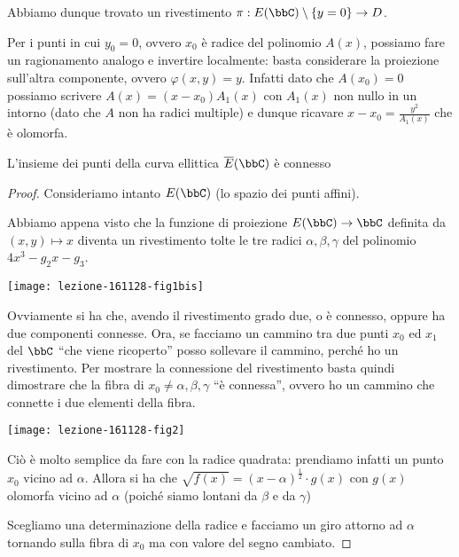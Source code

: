Abbiamo dunque trovato un rivestimento $\pi: E(\bbC)\setminus\{y=0\}\to D$.

Per i punti in cui $y_0=0$, ovvero $x_0$ è radice del polinomio $A(x)$, possiamo fare un ragionamento analogo e invertire localmente: basta considerare la proiezione sull'altra componente, ovvero $\varphi(x,y)=y$. Infatti dato che $A(x_0)=0$ possiamo scrivere $A(x)=(x-x_0)A_1(x)$ con $A_1(x)$ non nullo in un intorno (dato che $A$ non ha radici multiple) e dunque ricavare $x-x_0=\frac{y^2}{A_1(x)}$ che è olomorfa.

\begin{proposizione}
    L'insieme dei punti della curva ellittica $\ol{E}(\bbC)$ è connesso
\end{proposizione}
\begin{proof}
    Consideriamo intanto $E(\bbC)$ (lo spazio dei punti affini).


    Abbiamo appena visto che la funzione di proiezione $E(\bbC) \rar \bbC$ definita da $(x, y) \mapsto x$ diventa un rivestimento tolte le tre radici $\alpha, \beta, \gamma$ del polinomio $4x^3 - g_2 x - g_3$.

    \begin{center}
      \texttt{[image: lezione-161128-fig1bis]}
    \end{center}


    Ovviamente si ha che, avendo il rivestimento grado due, o è connesso, oppure ha due componenti connesse. Ora, se facciamo un cammino tra due punti $x_0$ ed $x_1$ del $\bbC$ ``che viene ricoperto'' posso sollevare il cammino, perché ho un rivestimento. Per mostrare la connessione del rivestimento basta quindi dimostrare che la fibra di $x_0 \neq \alpha,
    \beta, \gamma$ ``è connessa'', ovvero ho un cammino che connette i due elementi della fibra.

    \begin{center}
      \texttt{[image: lezione-161128-fig2]}
    \end{center}

    Ciò è molto semplice da fare con la radice quadrata: prendiamo infatti un punto $x_0$ vicino ad $\alpha$. Allora si ha che
    $\sqrt{f(x)} = (x - \alpha)^{\frac{1}{2}} \cdot g(x)$ con $g(x)$ olomorfa vicino ad $\alpha$ (poiché siamo lontani da $\beta$ e da $\gamma$)

    Scegliamo una determinazione della radice e facciamo un giro attorno ad $\alpha$ tornando sulla fibra di $x_0$ ma con valore del segno cambiato.

\end{proof}





